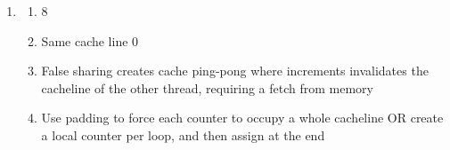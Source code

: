 \documentclass[12pt, a4paper]{article}
\begin{document}
\begin{enumerate}[Q\arabic*.]
  \item 
    \begin{enumerate}
      \item 8
      \item Same cache line $0$
      \item False sharing creates cache ping-pong where increments invalidates the cacheline of the other thread, requiring a fetch from memory 
      \item Use padding to force each counter to occupy a whole cacheline OR create a local counter per loop, and then assign at the end
    \end{enumerate}
\end{enumerate}
\end{document}
